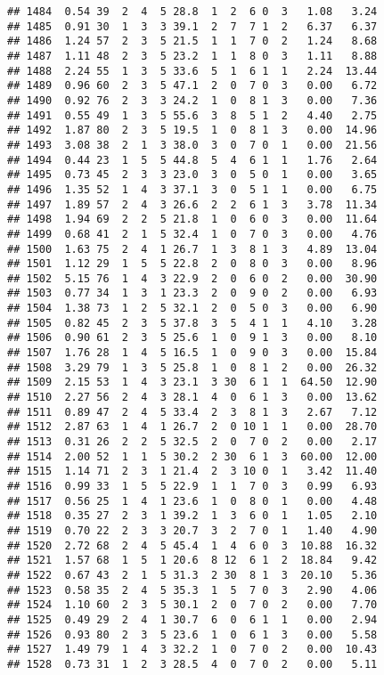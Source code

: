 \documentclass[
]{article}
\begin{document}
\begin{verbatim}
## 1484  0.54 39  2  4  5 28.8  1  2  6 0  3   1.08   3.24
## 1485  0.91 30  1  3  3 39.1  2  7  7 1  2   6.37   6.37
## 1486  1.24 57  2  3  5 21.5  1  1  7 0  2   1.24   8.68
## 1487  1.11 48  2  3  5 23.2  1  1  8 0  3   1.11   8.88
## 1488  2.24 55  1  3  5 33.6  5  1  6 1  1   2.24  13.44
## 1489  0.96 60  2  3  5 47.1  2  0  7 0  3   0.00   6.72
## 1490  0.92 76  2  3  3 24.2  1  0  8 1  3   0.00   7.36
## 1491  0.55 49  1  3  5 55.6  3  8  5 1  2   4.40   2.75
## 1492  1.87 80  2  3  5 19.5  1  0  8 1  3   0.00  14.96
## 1493  3.08 38  2  1  3 38.0  3  0  7 0  1   0.00  21.56
## 1494  0.44 23  1  5  5 44.8  5  4  6 1  1   1.76   2.64
## 1495  0.73 45  2  3  3 23.0  3  0  5 0  1   0.00   3.65
## 1496  1.35 52  1  4  3 37.1  3  0  5 1  1   0.00   6.75
## 1497  1.89 57  2  4  3 26.6  2  2  6 1  3   3.78  11.34
## 1498  1.94 69  2  2  5 21.8  1  0  6 0  3   0.00  11.64
## 1499  0.68 41  2  1  5 32.4  1  0  7 0  3   0.00   4.76
## 1500  1.63 75  2  4  1 26.7  1  3  8 1  3   4.89  13.04
## 1501  1.12 29  1  5  5 22.8  2  0  8 0  3   0.00   8.96
## 1502  5.15 76  1  4  3 22.9  2  0  6 0  2   0.00  30.90
## 1503  0.77 34  1  3  1 23.3  2  0  9 0  2   0.00   6.93
## 1504  1.38 73  1  2  5 32.1  2  0  5 0  3   0.00   6.90
## 1505  0.82 45  2  3  5 37.8  3  5  4 1  1   4.10   3.28
## 1506  0.90 61  2  3  5 25.6  1  0  9 1  3   0.00   8.10
## 1507  1.76 28  1  4  5 16.5  1  0  9 0  3   0.00  15.84
## 1508  3.29 79  1  3  5 25.8  1  0  8 1  2   0.00  26.32
## 1509  2.15 53  1  4  3 23.1  3 30  6 1  1  64.50  12.90
## 1510  2.27 56  2  4  3 28.1  4  0  6 1  3   0.00  13.62
## 1511  0.89 47  2  4  5 33.4  2  3  8 1  3   2.67   7.12
## 1512  2.87 63  1  4  1 26.7  2  0 10 1  1   0.00  28.70
## 1513  0.31 26  2  2  5 32.5  2  0  7 0  2   0.00   2.17
## 1514  2.00 52  1  1  5 30.2  2 30  6 1  3  60.00  12.00
## 1515  1.14 71  2  3  1 21.4  2  3 10 0  1   3.42  11.40
## 1516  0.99 33  1  5  5 22.9  1  1  7 0  3   0.99   6.93
## 1517  0.56 25  1  4  1 23.6  1  0  8 0  1   0.00   4.48
## 1518  0.35 27  2  3  1 39.2  1  3  6 0  1   1.05   2.10
## 1519  0.70 22  2  3  3 20.7  3  2  7 0  1   1.40   4.90
## 1520  2.72 68  2  4  5 45.4  1  4  6 0  3  10.88  16.32
## 1521  1.57 68  1  5  1 20.6  8 12  6 1  2  18.84   9.42
## 1522  0.67 43  2  1  5 31.3  2 30  8 1  3  20.10   5.36
## 1523  0.58 35  2  4  5 35.3  1  5  7 0  3   2.90   4.06
## 1524  1.10 60  2  3  5 30.1  2  0  7 0  2   0.00   7.70
## 1525  0.49 29  2  4  1 30.7  6  0  6 1  1   0.00   2.94
## 1526  0.93 80  2  3  5 23.6  1  0  6 1  3   0.00   5.58
## 1527  1.49 79  1  4  3 32.2  1  0  7 0  2   0.00  10.43
## 1528  0.73 31  1  2  3 28.5  4  0  7 0  2   0.00   5.11

\end{verbatim}
\end{document}
